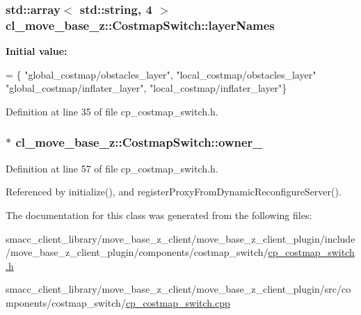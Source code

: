 \subsubsection[{\texorpdfstring{layer\+Names}{layerNames}}]{\setlength{\rightskip}{0pt plus 5cm}std\+::array$<$ std\+::string, 4 $>$ cl\+\_\+move\+\_\+base\+\_\+z\+::\+Costmap\+Switch\+::layer\+Names\hspace{0.3cm}{\ttfamily [static]}}\hypertarget{classcl__move__base__z_1_1CostmapSwitch_aee0c75c8f4459cacaf583ef8c90ff329}{}\label{classcl__move__base__z_1_1CostmapSwitch_aee0c75c8f4459cacaf583ef8c90ff329}
{\bfseries Initial value\+:}
\begin{DoxyCode}
=
        \{
            \textcolor{stringliteral}{"global\_costmap/obstacles\_layer"},
            \textcolor{stringliteral}{"local\_costmap/obstacles\_layer"}
            \textcolor{stringliteral}{"global\_costmap/inflater\_layer"},
            \textcolor{stringliteral}{"local\_costmap/inflater\_layer"}\}
\end{DoxyCode}


Definition at line 35 of file cp\+\_\+costmap\+\_\+switch.\+h.

\subsubsection[{\texorpdfstring{owner\+\_\+}{owner_}}]{$\ast$ cl\+\_\+move\+\_\+base\+\_\+z\+::\+Costmap\+Switch\+::owner\+\_\+\hspace{0.3cm}{\ttfamily [private]}}\hypertarget{classcl__move__base__z_1_1CostmapSwitch_a42a7da3f7301daa691ef1593ae926618}{}\label{classcl__move__base__z_1_1CostmapSwitch_a42a7da3f7301daa691ef1593ae926618}


Definition at line 57 of file cp\+\_\+costmap\+\_\+switch.\+h.



Referenced by initialize(), and register\+Proxy\+From\+Dynamic\+Reconfigure\+Server().



The documentation for this class was generated from the following files\+:\begin{DoxyCompactItemize}
\item 
smacc\+\_\+client\+\_\+library/move\+\_\+base\+\_\+z\+\_\+client/move\+\_\+base\+\_\+z\+\_\+client\+\_\+plugin/include/move\+\_\+base\+\_\+z\+\_\+client\+\_\+plugin/components/costmap\+\_\+switch/\hyperlink{cp__costmap__switch_8h}{cp\+\_\+costmap\+\_\+switch.\+h}\item 
smacc\+\_\+client\+\_\+library/move\+\_\+base\+\_\+z\+\_\+client/move\+\_\+base\+\_\+z\+\_\+client\+\_\+plugin/src/components/costmap\+\_\+switch/\hyperlink{cp__costmap__switch_8cpp}{cp\+\_\+costmap\+\_\+switch.\+cpp}\end{DoxyCompactItemize}
